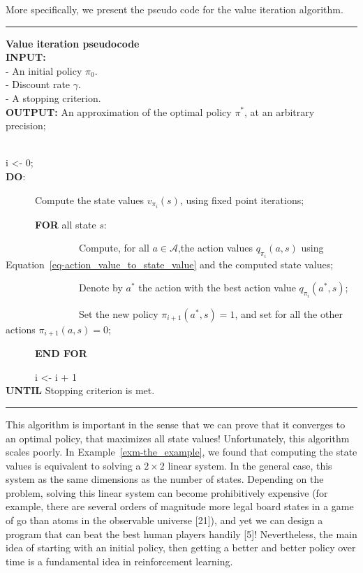 \documentclass[
  letterpaper,
]{report}
\theoremstyle{definition}
\theoremstyle{plain}
\theoremstyle{definition}
\theoremstyle{remark}
\begin{document}
More specifically, we present the pseudo code for the value iteration
algorithm.

\begin{center}\rule{0.5\linewidth}{0.5pt}\end{center}

\textbf{Value iteration pseudocode}\\
\textbf{INPUT:}\\
- An initial policy \(\pi_0\).\\
- Discount rate \(\gamma\).\\
- A stopping criterion.\\
\textbf{OUTPUT:} An approximation of the optimal policy \(\pi^*\), at an
arbitrary precision;\\
\strut \\
i \textless- 0;\\
\textbf{DO}:\\
\strut ~~~~~~Compute the state values \(v_{\pi_i}(s)\), using fixed
point iterations;\\
\strut ~~~~~~\textbf{FOR} all state \(s\):\\
\strut ~~~~~~~~~~~~~~~Compute, for all \(a\in\mathcal{A}\),the action
values \(q_{\pi_i}(a,s)\) using
Equation~\ref{eq-action_value_to_state_value} and the computed state
values;\\
\strut ~~~~~~~~~~~~~~~Denote by \(a^*\) the action with the best action
value \(q_{\pi_i}(a^*,s)\);\\
\strut ~~~~~~~~~~~~~~~Set the new policy \(\pi_{i+1}(a^*,s) = 1\), and
set for all the other actions \(\pi_{i+1}(a,s) = 0\);\\
\strut ~~~~~~\textbf{END FOR}\\
\strut ~~~~~~i \textless- i + 1\\
\textbf{UNTIL} Stopping criterion is met.

\begin{center}\rule{0.5\linewidth}{0.5pt}\end{center}

This algorithm is important in the sense that we can prove that it
converges to an optimal policy, that maximizes all state values!
Unfortunately, this algorithm scales poorly. In
Example~\ref{exm-the_example}, we found that computing the state values
is equivalent to solving a \(2\times 2\) linear system. In the general
case, this system as the same dimensions as the number of states.
Depending on the problem, solving this linear system can become
prohibitively expensive (for example, there are several orders of
magnitude more legal board states in a game of go than atoms in the
observable universe {[}21{]}), and yet we can design a program that can
beat the best human players handily {[}5{]}! Nevertheless, the main idea
of starting with an initial policy, then getting a better and better
policy over time is a fundamental idea in reinforcement learning.
\end{document}
